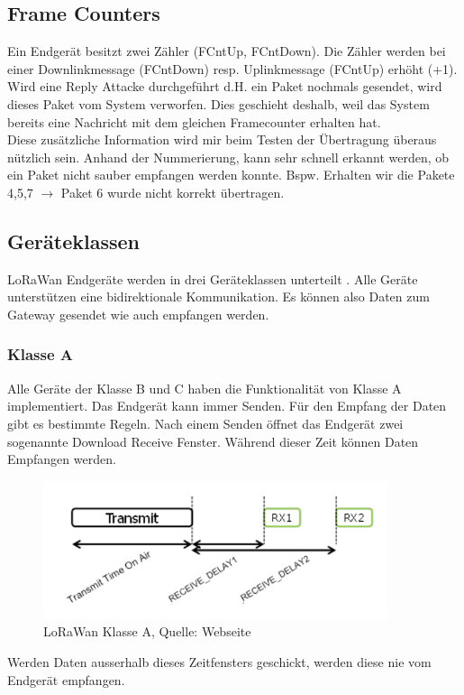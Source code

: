 \documentclass[11pt,english,german]{report}
\theoremstyle{definition}
\begin{document}
\subsection{Frame Counters}
Ein Endgerät besitzt zwei Zähler (FCntUp, FCntDown). Die Zähler werden bei einer Downlinkmessage (FCntDown) resp. Uplinkmessage (FCntUp) erhöht (+1).\\[0.3cm]
Wird eine Reply Attacke durchgeführt d.H. ein Paket nochmals gesendet, wird dieses Paket vom System verworfen. Dies geschieht deshalb, weil das System bereits eine Nachricht mit dem gleichen Framecounter erhalten hat.\\[0.3cm]
Diese zusätzliche Information wird mir beim Testen der Übertragung überaus nützlich sein. Anhand der Nummerierung, kann sehr schnell erkannt werden, ob ein Paket nicht sauber empfangen werden konnte. Bspw. Erhalten wir die Pakete 4,5,7 $\rightarrow$ Paket 6 wurde nicht korrekt übertragen.

\newpage
\subsection{Geräteklassen}
LoRaWan Endgeräte werden in drei Geräteklassen unterteilt \cite{lorawan_classes}. Alle Geräte unterstützen eine bidirektionale Kommunikation. Es können also Daten zum Gateway gesendet wie auch empfangen werden.
\subsubsection{Klasse A}
Alle Geräte der Klasse B und C haben die Funktionalität von Klasse A implementiert. Das Endgerät kann immer Senden. Für den Empfang der Daten gibt es bestimmte Regeln. Nach einem Senden öffnet das Endgerät zwei sogenannte Download Receive Fenster. Während dieser Zeit können Daten Empfangen werden. 

\begin{figure}[H]
	\centering
	\includegraphics[width=0.9\textwidth]{img/lora/lorawan_class_a.png}
	\caption[LoRaWan Klasse A]
	{LoRaWan Klasse A, Quelle: Webseite \cite{loraclass}}
\end{figure}
\noindent
Werden Daten ausserhalb dieses Zeitfensters geschickt, werden diese nie vom Endgerät empfangen.
\end{document}
